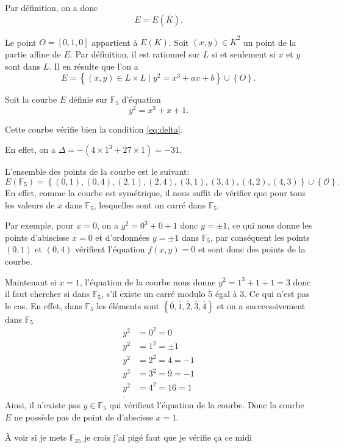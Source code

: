 Par définition, on a donc
\[
E = E(\overline{K})
.\] 

Le point $O = [0,1,0]$ appartient à $E(K)$. Soit $(x,y) \in \overline{K}^2$ un point de la partie affine de $E$. Par définition, il est rationnel sur $L$ si et seulement si $x$ et $y$ sont dans $L$. Il en résulte que l'on a 
\[
E = \left\{ (x,y) \in L \times L \mid y^2 = x^3+ax+b \right\} \cup \left\{ O \right\} 
.\] 

\begin{exemple}
    Soit la courbe $E$ définie sur $\mathbb{F}_{5}$ d'équation
    \[
    y^2 =x^3+x+1
    .\] 

    Cette courbe vérifie bien la condition \eqref{eq:delta}.
    
    En effet, on a $\Delta = -(4 \times 1^3 + 27 \times 1) = -31$.

    L'ensemble des points de la courbe est le suivant:
    \[
    E(\mathbb{F}_{5})= \left\{ (0,1),(0,4),(2,1),(2,4),(3,1),(3,4),(4,2),(4,3) \right\} \cup
    \left\{ \mathcal{O} \right\} 
    .\] 
    En effet, comme la courbe est symétrique, il nous suffit de vérifier que pour tous les
    valeurs de $x$ dans $\mathbb{F}_{5}$, lesquelles sont un carré dans $\mathbb{F}_{5}$.

    Par exemple, pour $x=0$, on a $y^2=0^3+0+1$ donc $y = \pm 1$, ce qui nous donne
    les points d'abiscisse $x=0$ et d'ordonnées $y=\pm 1$ dans $\mathbb{F}_{5}$, par
    conséquent les points $(0,1)$ et $(0,4)$ vérifient l'équation $f(x,y) = 0$ et sont
    donc des points de la courbe.

    Maintenant si $x=1$, l'équation de la courbe nous donne $y^2=1^3+1+1=3$ donc il faut
    chercher si dans $\mathbb{F}_{5}$, s'il existe un carré modulo $5$ égal à 3. Ce qui n'est
    pas le cas. En effet, dans $\mathbb{F}_{5}$ les éléments sont $\left\{
    \overline{0},\overline{1},\overline{2},\overline{3},\overline{4} \right\} $ et on a
    succecssivement dans $\mathbb{F}_{5}$
    \begin{align*}
        y^2 &=0^2=0 \\
        y^2 &= 1^2 = \pm 1 \\
        y^2 &= 2^2=4=-1 \\
        y^2 &= 3^2=9=-1 \\
        y^2 &= 4^2=16=1 \\
    .\end{align*}
    Ainsi, il n'existe pas $y \in \mathbb{F}_{5}$ qui vérifient l'équation de la
    courbe. Donc la courbe $E$ ne possède pas de point de d'abscisse $x=1$.

    À voir si je mets $\mathbb{F}_{25}$ je crois j'ai pigé faut que je vérifie ça ce midi
\end{exemple}

